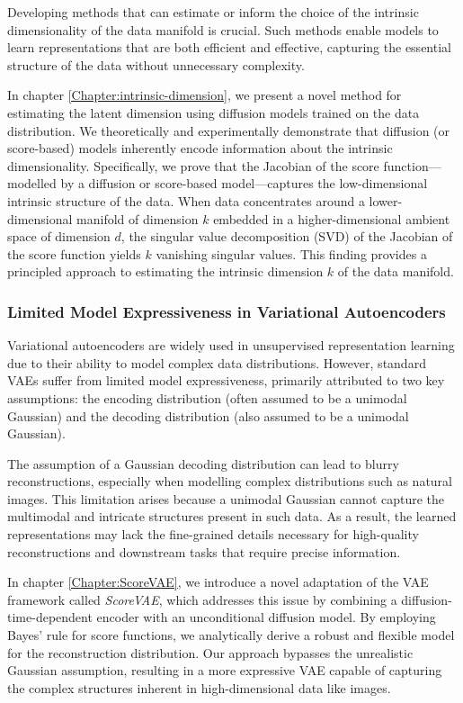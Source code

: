 Developing methods that can estimate or inform the choice of the intrinsic dimensionality of the data manifold is crucial. Such methods enable models to learn representations that are both efficient and effective, capturing the essential structure of the data without unnecessary complexity.

In chapter \ref{Chapter:intrinsic-dimension}, we present a novel method for estimating the latent dimension using diffusion models trained on the data distribution. We theoretically and experimentally demonstrate that diffusion (or score-based) models inherently encode information about the intrinsic dimensionality. Specifically, we prove that the Jacobian of the score function—modelled by a diffusion or score-based model—captures the low-dimensional intrinsic structure of the data. When data concentrates around a lower-dimensional manifold of dimension \( k \) embedded in a higher-dimensional ambient space of dimension \( d \), the singular value decomposition (SVD) of the Jacobian of the score function yields \( k \) vanishing singular values. This finding provides a principled approach to estimating the intrinsic dimension \( k \) of the data manifold.

\subsubsection{Limited Model Expressiveness in Variational Autoencoders}

Variational autoencoders are widely used in unsupervised representation learning due to their ability to model complex data distributions. However, standard VAEs suffer from limited model expressiveness, primarily attributed to two key assumptions: the encoding distribution (often assumed to be a unimodal Gaussian) and the decoding distribution (also assumed to be a unimodal Gaussian).

The assumption of a Gaussian decoding distribution can lead to blurry reconstructions, especially when modelling complex distributions such as natural images. This limitation arises because a unimodal Gaussian cannot capture the multimodal and intricate structures present in such data. As a result, the learned representations may lack the fine-grained details necessary for high-quality reconstructions and downstream tasks that require precise information.

In chapter \ref{Chapter:ScoreVAE}, we introduce a novel adaptation of the VAE framework called \textit{ScoreVAE}, which addresses this issue by combining a diffusion-time-dependent encoder with an unconditional diffusion model. By employing Bayes' rule for score functions, we analytically derive a robust and flexible model for the reconstruction distribution. Our approach bypasses the unrealistic Gaussian assumption, resulting in a more expressive VAE capable of capturing the complex structures inherent in high-dimensional data like images.


